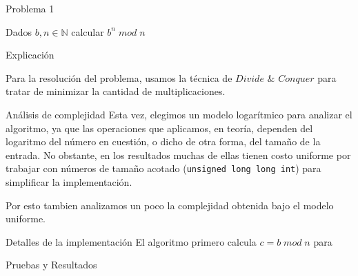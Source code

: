 \begin{section}{Problema 1}

	Dados $b,n \in \mathbb{N} $ calcular $b^n\; mod\; n$

	\begin{subsection}{Explicación}

		Para la resolución del problema, usamos la técnica de $Divide$ $\&$ $Conquer$ para tratar de minimizar la cantidad
	de multiplicaciones. 

		\begin{subsubsection}{Análisis de complejidad}
		Esta vez, elegimos un modelo logarítmico para analizar el algoritmo, ya que las operaciones que aplicamos, 
		en teoría, dependen del logaritmo del número en cuestión, o dicho de otra forma, del tamaño de la entrada.
		No obstante, en los resultados muchas de ellas tienen costo uniforme por trabajar con números de tamaño acotado (\texttt{unsigned long long int}) para simplificar la implementación.

		Por esto tambien analizamos un poco la complejidad obtenida bajo el modelo uniforme. \\

		\end{subsubsection}
	\end{subsection}

	\begin{subsection}{Detalles de la implementación}
		El algoritmo primero calcula $c = b\;mod\;n$ para 

	\end{subsection}

	\begin{subsection}{Pruebas y Resultados}

	\end{subsection}

\end{section}

